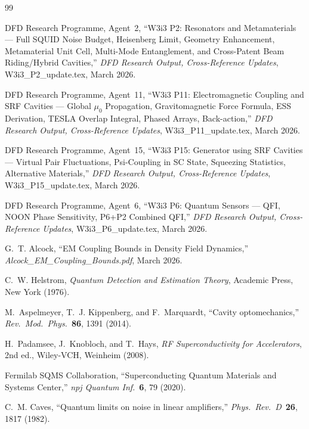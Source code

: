 \documentclass[11pt,twocolumn]{article}
\theoremstyle{definition}
\theoremstyle{remark}
\begin{document}
\begin{thebibliography}{99}

DFD Research Programme, Agent~2,
``W3i3 P2: Resonators and Metamaterials --- Full SQUID Noise Budget,
Heisenberg Limit, Geometry Enhancement, Metamaterial Unit Cell,
Multi-Mode Entanglement, and Cross-Patent Beam Riding/Hybrid Cavities,''
\textit{DFD Research Output, Cross-Reference Updates},
W3i3\_P2\_update.tex, March 2026.

DFD Research Programme, Agent~11,
``W3i3 P11: Electromagnetic Coupling and SRF Cavities ---
Global $\mu_0$ Propagation, Gravitomagnetic Force Formula,
ESS Derivation, TESLA Overlap Integral, Phased Arrays, Back-action,''
\textit{DFD Research Output, Cross-Reference Updates},
W3i3\_P11\_update.tex, March 2026.

DFD Research Programme, Agent~15,
``W3i3 P15: Generator using SRF Cavities ---
Virtual Pair Fluctuations, Psi-Coupling in SC State,
Squeezing Statistics, Alternative Materials,''
\textit{DFD Research Output, Cross-Reference Updates},
W3i3\_P15\_update.tex, March 2026.

DFD Research Programme, Agent~6,
``W3i3 P6: Quantum Sensors ---
QFI, NOON Phase Sensitivity, P6+P2 Combined QFI,''
\textit{DFD Research Output, Cross-Reference Updates},
W3i3\_P6\_update.tex, March 2026.

G.~T. Alcock,
``EM Coupling Bounds in Density Field Dynamics,''
\textit{Alcock\_EM\_Coupling\_Bounds.pdf}, March 2026.

C.~W. Helstrom,
\textit{Quantum Detection and Estimation Theory},
Academic Press, New York (1976).

M.~Aspelmeyer, T.~J. Kippenberg, and F.~Marquardt,
``Cavity optomechanics,''
\textit{Rev.\ Mod.\ Phys.}\ \textbf{86}, 1391 (2014).

H.~Padamsee, J.~Knobloch, and T.~Hays,
\textit{RF Superconductivity for Accelerators},
2nd ed., Wiley-VCH, Weinheim (2008).

Fermilab SQMS Collaboration,
``Superconducting Quantum Materials and Systems Center,''
\textit{npj Quantum Inf.}\ \textbf{6}, 79 (2020).

C.~M. Caves,
``Quantum limits on noise in linear amplifiers,''
\textit{Phys.\ Rev.\ D}\ \textbf{26}, 1817 (1982).

\end{thebibliography}
\end{document}
